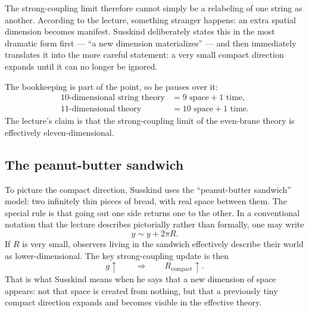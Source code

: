 The strong-coupling limit therefore cannot simply be a relabeling of one string as another. According to the lecture, something stranger happens: an extra spatial dimension becomes manifest. Susskind deliberately states this in the most dramatic form first --- ``a new dimension materializes'' --- and then immediately translates it into the more careful statement: a very small compact direction expands until it can no longer be ignored.

The bookkeeping is part of the point, so he pauses over it:
\begin{equation}
\begin{aligned}
10\text{-dimensional string theory} &= 9\text{ space}+1\text{ time},\\
11\text{-dimensional theory} &= 10\text{ space}+1\text{ time}.
\end{aligned}
\end{equation}
The lecture's claim is that the strong-coupling limit of the even-brane theory is effectively eleven-dimensional.


\subsection{The peanut-butter sandwich}

To picture the compact direction, Susskind uses the ``peanut-butter sandwich'' model: two infinitely thin pieces of bread, with real space between them. The special rule is that going out one side returns one to the other. In a conventional notation that the lecture describes pictorially rather than formally, one may write
\begin{equation}
y \sim y + 2\pi R.
\end{equation}
If \(R\) is very small, observers living in the sandwich effectively describe their world as lower-dimensional. The key strong-coupling update is then
\begin{equation}
g\uparrow
\qquad \Longrightarrow \qquad
R_{\mathrm{compact}}\uparrow.
\end{equation}
That is what Susskind means when he says that a new dimension of space appears: not that space is created from nothing, but that a previously tiny compact direction expands and becomes visible in the effective theory.


